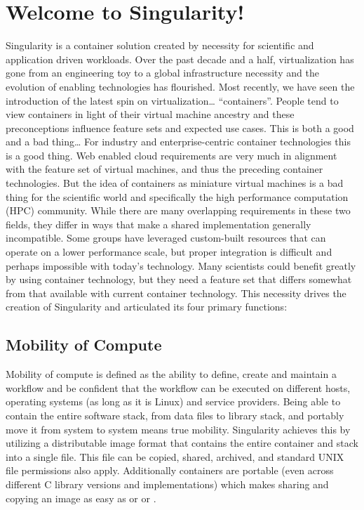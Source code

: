 \documentclass[letterpaper,10pt,english]{sphinxmanual}
\begin{document}
\section{Welcome to Singularity!}
\label{\detokenize{introduction:welcome-to-singularity}}
Singularity is a container solution created by necessity for
scientific and application driven workloads.
Over the past decade and a half, virtualization has gone from an
engineering toy to a global infrastructure necessity and the evolution
of enabling technologies has flourished. Most recently, we have seen
the introduction of the latest spin on virtualization… “containers”.
People tend to view containers in light of their virtual machine
ancestry and these preconceptions influence feature sets and expected
use cases. This is both a good and a bad thing…
For industry and enterprise-centric container technologies this is a
good thing. Web enabled cloud requirements are very much in alignment
with the feature set of virtual machines, and thus the preceding
container technologies. But the idea of containers as miniature
virtual machines is a bad thing for the scientific world and
specifically the high performance computation (HPC) community. While
there are many overlapping requirements in these two fields, they
differ in ways that make a shared implementation generally
incompatible. Some groups have leveraged custom-built resources that
can operate on a lower performance scale, but proper integration is
difficult and perhaps impossible with today’s technology.
Many scientists could benefit greatly by using container technology,
but they need a feature set that differs somewhat from that available
with current container technology. This necessity drives the creation
of Singularity and articulated its four primary functions:


\subsection{Mobility of Compute}
\label{\detokenize{introduction:mobility-of-compute}}
Mobility of compute is defined as the ability to define, create and
maintain a workflow and be confident that the workflow can be executed
on different hosts, operating systems (as long as it is Linux) and
service providers. Being able to contain the entire software stack,
from data files to library stack, and portably move it from system to
system means true mobility.
Singularity achieves this by utilizing a distributable image format
that contains the entire container and stack into a single file. This
file can be copied, shared, archived, and standard UNIX file
permissions also apply. Additionally containers are portable (even
across different C library versions and implementations) which makes
sharing and copying an image as easy as  or  or .
\end{document}
